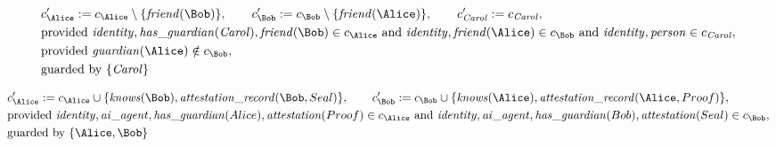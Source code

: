 \begin{align*}
&
c'_
{
\Alice
}
 := 
c_
{
\Alice
}
 \setminus 
\{
\mathit{\detokenize{
friend
}}
(
\Bob
)
\}
, \qquad 
c'_
{
\Bob
}
 := 
c_
{
\Bob
}
 \setminus 
\{
\mathit{\detokenize{
friend
}}
(
\Alice
)
\}
, \qquad 
c'_
{
\mathit{Carol}
}
 := 
c_
{
\mathit{Carol}
}
,\\
&
\text{provided } 
\mathit{\detokenize{
identity
}}
,
\mathit{\detokenize{
has_guardian
}}
(
\mathit{Carol}
)
,
\mathit{\detokenize{
friend
}}
(
\Bob
)
 \in c_
{
\Alice
}
 \text{ and } 
\mathit{\detokenize{
identity
}}
,
\mathit{\detokenize{
friend
}}
(
\Alice
)
 \in c_
{
\Bob
}
 \text{ and } 
\mathit{\detokenize{
identity
}}
,
\mathit{\detokenize{
person
}}
 \in c_
{
\mathit{Carol}
}
,\\
&
\text{provided } 
\mathit{\detokenize{
guardian
}}
(
\Alice
)
 \notin c_
{
\Bob
}
,\\
&
\text{guarded by } \{
\mathit{Carol}
\}
\end{align*}

\begin{align*}
&
c'_
{
\Alice
}
 := 
c_
{
\Alice
}
 \cup 
\{
\mathit{\detokenize{
knows
}}
(
\Bob
)
,
\mathit{\detokenize{
attestation_record
}}
(
\Bob
,
Seal
)
\}
, \qquad 
c'_
{
\Bob
}
 := 
c_
{
\Bob
}
 \cup 
\{
\mathit{\detokenize{
knows
}}
(
\Alice
)
,
\mathit{\detokenize{
attestation_record
}}
(
\Alice
,
Proof
)
\}
,\\
&
\text{provided } 
\mathit{\detokenize{
identity
}}
,
\mathit{\detokenize{
ai_agent
}}
,
\mathit{\detokenize{
has_guardian
}}
(
Alice
)
,
\mathit{\detokenize{
attestation
}}
(
Proof
)
 \in c_
{
\Alice
}
 \text{ and } 
\mathit{\detokenize{
identity
}}
,
\mathit{\detokenize{
ai_agent
}}
,
\mathit{\detokenize{
has_guardian
}}
(
Bob
)
,
\mathit{\detokenize{
attestation
}}
(
Seal
)
 \in c_
{
\Bob
}
,\\
&
\text{guarded by } \{
\Alice
,
\Bob
\}
\end{align*}

